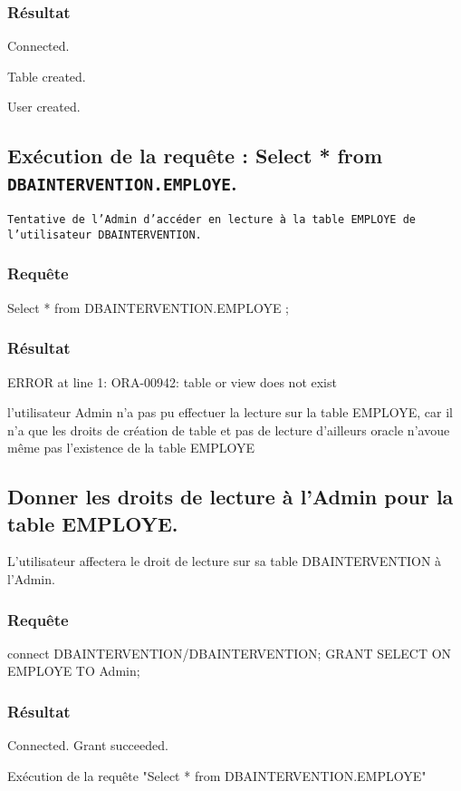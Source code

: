 \documentclass[•]{article}
\begin{document}
\subsubsection{Résultat}
\begin{sql}
Connected.

Table created.

User created.
\end{sql}


\subsection{Exécution de la requête : Select * from \texttt{DBAINTERVENTION.EMPLOYE}.}
\texttt{Tentative de l'Admin d'accéder en lecture à la table EMPLOYE de l'utilisateur DBAINTERVENTION. }
\subsubsection{Requête}
\begin{sql}
Select * from DBAINTERVENTION.EMPLOYE ;
\end{sql}
\subsubsection{Résultat}
\begin{sql}
ERROR at line 1:
ORA-00942: table or view does not exist
\end{sql}

\textrm{l'utilisateur Admin n'a pas pu effectuer la lecture sur la table EMPLOYE,
car il n'a que les droits de création de table et pas de lecture
d'ailleurs oracle n'avoue même pas l'existence de la table EMPLOYE}

\subsection{Donner les droits de lecture à l'Admin pour la table EMPLOYE. }
\textrm{L'utilisateur affectera le droit de lecture sur sa table DBAINTERVENTION à l'Admin. }
\subsubsection{Requête}
\begin{sql}
connect DBAINTERVENTION/DBAINTERVENTION;
	GRANT SELECT ON EMPLOYE TO Admin;
\end{sql}
\subsubsection{Résultat}
\begin{sql}
Connected.
Grant succeeded.
\end{sql}
\textrm{Exécution de la requête "Select * from DBAINTERVENTION.EMPLOYE"}
\end{document}
